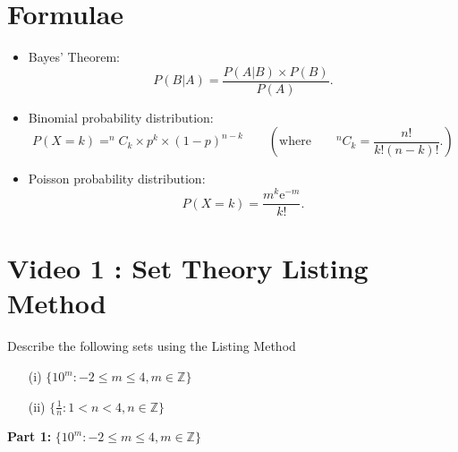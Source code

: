 \documentclass[]{report}
\begin{document}
\newpage
\section*{Formulae}
\begin{itemize}
	
	
	
	
	\item Bayes' Theorem:
	\begin{equation*}
	P(B|A)=\frac{P\left(A|B\right) \times P(B) }{P\left( A\right) }.
	\end{equation*}
	
	
	
	\item Binomial probability distribution:
	\begin{equation*}
	P(X = k) = ^{n}C_{k} \times p^{k} \times \left( 1-p\right) ^{n-k}\qquad \left( \text{where}\qquad
	^{n}C_{k} =\frac{n!}{k!\left(n-k\right) !}. \right)
	\end{equation*}
	
	\item Poisson probability distribution:
	\begin{equation*}
	P(X = k) =\frac{m^{k}\mathrm{e}^{-m}}{k!}.
	\end{equation*}
\end{itemize}

\section{Video 1 :  Set Theory Listing Method}

\Large
Describe the following sets using the Listing Method

\begin{itemize}
	\item[(i)] $ \{ 10^m : -2 \leq m \leq 4, m \in \mathbb{Z} \} $
	\item[(ii)]  $ \{ \frac{1}{n}: 1 < n < 4, n \in \mathbb{Z} \} $
\end{itemize}



\Large
\vspace{-4cm}
\textbf{Part 1:} $ \{ 10^m : -2 \leq m \leq 4, m \in \mathbb{Z} \} $


\end{document}
